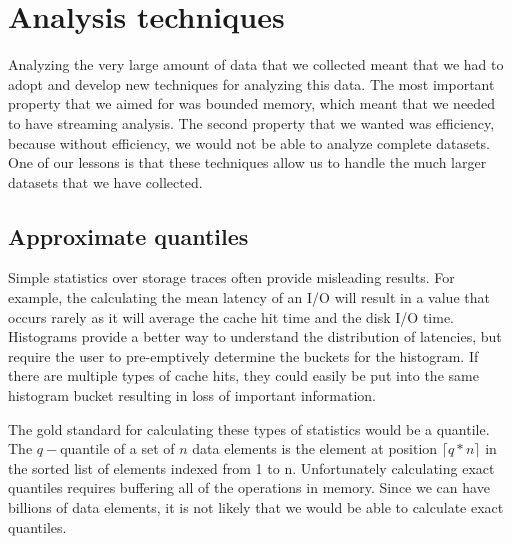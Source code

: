 \section{Analysis techniques}
\label{sec:analysis-techniques}

Analyzing the very large amount of data that we collected meant that
we had to adopt and develop new techniques for analyzing this data.
The most important property that we aimed for was bounded memory,
which meant that we needed to have streaming analysis.  The second
property that we wanted was efficiency, because without efficiency, we
would not be able to analyze complete datasets.  One of our lessons is
that these techniques allow us to handle the much larger datasets that
we have collected.

\subsection{Approximate quantiles}

Simple statistics over storage traces often provide misleading
results.  For example, the calculating the mean latency of an I/O will
result in a value that occurs rarely as it will average the cache hit
time and the disk I/O time.  Histograms provide a better way to
understand the distribution of latencies, but require the user to
pre-emptively determine the buckets for the histogram.  If there are
multiple types of cache hits, they could easily be put into the same
histogram bucket resulting in loss of important information.

The gold standard for calculating these types of statistics would be a
quantile.  The $q-$quantile of a set of $n$ data elements is the
element at position $\lceil q*n\rceil$ in the sorted list of elements
indexed from 1 to n.  Unfortunately calculating exact quantiles
requires buffering all of the operations in memory.  Since we can have
billions of data elements, it is not likely that we would be able to
calculate exact quantiles.

